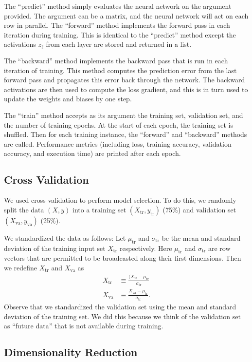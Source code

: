 \documentclass[12pt]{article}
\newcommand{\Xtr}{X_{\mbox{tr}}}
\newcommand{\ytr}{y_{\mbox{tr}}}
\newcommand{\Xva}{X_{\mbox{va}}}
\newcommand{\yva}{y_{\mbox{va}}}
\newcommand{\mutr}{\mu_{\mbox{tr}}}
\newcommand{\sigtr}{\sigma_{\mbox{tr}}}
\begin{document}
The ``predict'' method simply evaluates the neural network on the argument provided. The argument can be a matrix, and the neural network will act on each row in parallel. The ``forward'' method implements the forward pass in each iteration during training. This is identical to the ``predict'' method except the activations $z_{\ell}$ from each layer are stored and returned in a list.

The ``backward'' method implements the backward pass that is run in each iteration of training. This method computes the prediction error from the last forward pass and propagates this error back through the network. The backward activations are then used to compute the loss gradient, and this is in turn used to update the weights and biases by one step.

The ``train'' method accepts as its argument the training set, validation set, and the number of training epochs. At the start of each epoch, the training set is shuffled. Then for each training instance, the ``forward'' and ``backward'' methods are called. Performance metrics (including loss, training accuracy, validation accuracy, and execution time) are printed after each epoch.


\subsection{Cross Validation}

We used cross validation to perform model selection. To do this, we randomly split the data $(X, y)$ into a training set $(\Xtr, \ytr)$ (75\%) and validation set $(\Xva, \yva)$ (25\%).

We standardized the data as follows: Let $\mutr$ and $\sigtr$ be the mean and standard deviation of the training input set $\Xtr$ respectively. Here $\mutr$ and $\sigtr$ are row vectors that are permitted to be broadcasted along their first dimensions. Then we redefine $\Xtr$ and $\Xva$ as
\begin{align*}
\Xtr &\equiv \frac{(\Xtr-\mutr}{\sigtr} \\
\Xva &\equiv \frac{\Xva-\mutr}{\sigtr}.
\end{align*}
Observe that we standardized the validation set using the mean and standard deviation of the training set. We did this because we think of the validation set as ``future data'' that is not available during training.

\subsection{Dimensionality Reduction}
\label{methods-pca}
\end{document}
